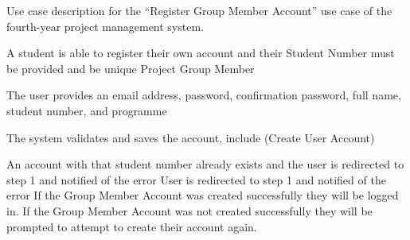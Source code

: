 \begin{table}
  \centering
  \caption{Use case description for the ``Register Group Member Account'' use case of the fourth-year project management system.}
  \label{tbl:use-case-register-member-account}

  \begin{usecase}
    A student is able to register their own account and their Student Number must be provided and be unique
    Project Group Member
    \ucnormal
    \begin{ucenum}
      \item The user provides an email address, password, confirmation password, full name, student number, and programme
      \item The system validates and saves the account, include (Create User Account)
    \end{ucenum}
    An account with that student number already exists and the user is redirected to step 1 and notified of the error
    User is redirected to step 1 and notified of the error
    If the Group Member Account was created successfully they will be logged in. If the Group Member Account was not created successfully they will be prompted to attempt to create their account again.
  \end{usecase}
\end{table}



